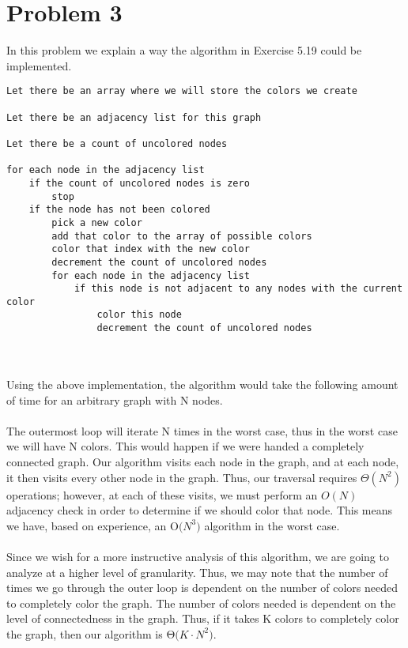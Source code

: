 \section*{Problem 3}

In this problem we explain a way the algorithm in Exercise 5.19 could be implemented.

{\noindent \hrulefill}
\begin{lstlisting}
Let there be an array where we will store the colors we create

Let there be an adjacency list for this graph

Let there be a count of uncolored nodes

for each node in the adjacency list
    if the count of uncolored nodes is zero
        stop
    if the node has not been colored
        pick a new color
        add that color to the array of possible colors
        color that index with the new color
        decrement the count of uncolored nodes
        for each node in the adjacency list
            if this node is not adjacent to any nodes with the current color 
                color this node
                decrement the count of uncolored nodes

\end{lstlisting}
\hrulefill
\\
\\
Using the above implementation, the algorithm would take the following amount of time for an arbitrary graph with N nodes.
\\
\\
The outermost loop will iterate N times in the worst case, thus in the worst case we will have N colors. This would happen if we were handed a completely connected graph. Our algorithm visits each node in the graph, and at each node, it then visits every other node in the graph. Thus, our traversal requires $\Theta(N^2)$ operations; however, at each of these visits, we must perform an $O(N)$ adjacency check in order to determine if we should color that node. This means we have, based on experience, an $\mathrm{O(}N^3 \mathrm{)}$ algorithm in the worst case. 
\\
\\
Since we wish for a more instructive analysis of this algorithm, we are going to analyze at a higher level of granularity. Thus, we may note that the number of times we go through the outer loop is dependent on the number of colors needed to completely color the graph. The number of colors needed is dependent on the level of connectedness in the graph. Thus, if it takes K colors to completely color the graph, then our algorithm is  $\mathrm{\Theta (}K \cdot N^2 \mathrm{)}$. 